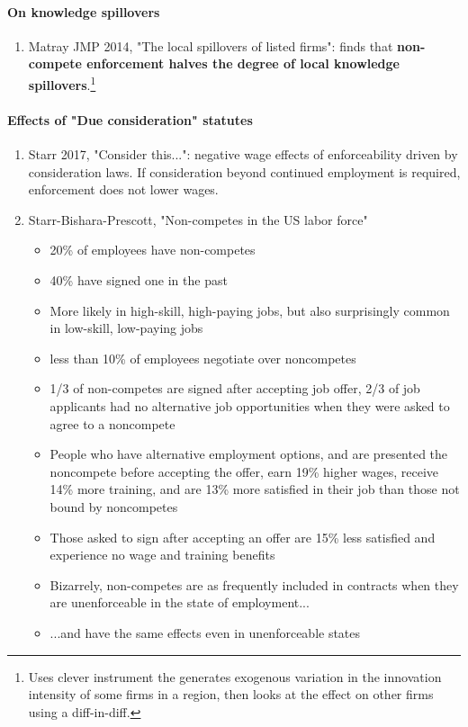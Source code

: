 \documentclass[12pt,english]{article}
\theoremstyle{remark}
\begin{document}
\paragraph{On knowledge spillovers}
\begin{enumerate}
	\item Matray JMP 2014, "The local spillovers of listed firms": finds that \textbf{non-compete enforcement halves the degree of local knowledge spillovers}.\footnote{Uses clever instrument the generates exogenous variation in the innovation intensity of some firms in a region, then looks at the effect on other firms using a diff-in-diff.} 
\end{enumerate}

\paragraph{Effects of "Due consideration" statutes}
\begin{enumerate}
	\item Starr 2017, "Consider this...": negative wage effects of enforceability driven by consideration laws. If consideration beyond continued employment is required, enforcement does not lower wages.
	\item Starr-Bishara-Prescott, "Non-competes in the US labor force"
	\begin{itemize}
		\item 20\% of employees have non-competes
		\item 40\% have signed one in the past
		\item More likely in high-skill, high-paying jobs, but also surprisingly common in low-skill, low-paying jobs
		\item less than 10\% of employees negotiate over noncompetes
		\item 1/3 of non-competes are signed after accepting job offer, 2/3 of job applicants had no alternative job opportunities when they were asked to agree to a noncompete
		\item People who have alternative employment options, and are presented the noncompete before accepting the offer, earn 19\% higher wages, receive 14\% more training, and are 13\% more satisfied in their job than those not bound by noncompetes
		\item Those asked to sign after accepting an offer are 15\% less satisfied and experience no wage and training benefits
		\item Bizarrely, non-competes are as frequently included in contracts when they are unenforceable in the state of employment...
		\item ...and have the same effects even in unenforceable states
	\end{itemize}
	
\end{enumerate}
\end{document}
